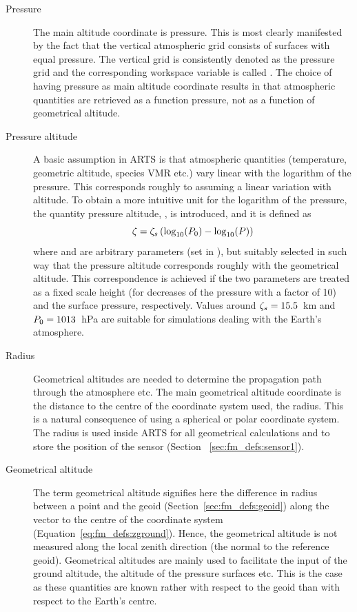 \begin{description}
  
\item[Pressure] The main altitude coordinate is
  pressure. This is most clearly manifested by the fact that the
  vertical atmospheric grid consists of surfaces with equal pressure.
  The vertical grid is consistently denoted as the pressure grid and
  the corresponding workspace variable is called . The
  choice of having pressure as main altitude coordinate results in
  that atmospheric quantities are retrieved as a function pressure,
  not as a function of geometrical altitude.
  
\item[Pressure altitude] A basic assumption
  in ARTS is that atmospheric quantities (temperature, geometric
  altitude, species VMR etc.) vary linear with the logarithm of the
  pressure. This corresponds roughly to assuming a linear variation
  with altitude. To obtain a more intuitive unit for the logarithm of
  the pressure, the quantity pressure altitude, \PrsAlt, is
  introduced, and it is defined as
  \begin{equation}
   \zeta = \zeta_{s}\left( \log_{10}(P_{0}) - \log_{10}(P) \right)
   \label{eq:fm_defs:prsalt}
  \end{equation}
  where  and  are arbitrary parameters (set in
  ), but suitably selected in such way that the pressure
  altitude corresponds roughly with the geometrical altitude.  This
  correspondence is achieved if the two parameters are treated as a
  fixed scale height (for decreases of the pressure with a factor of
  10) and the surface pressure, respectively. Values around
  $\zeta_{s}=15.5$~km and $P_{0}=1013$~hPa are suitable for
  simulations dealing with the Earth's atmosphere.
  
\item[Radius] Geometrical altitudes are
  needed to determine the propagation path through the atmosphere etc.
  The main geometrical altitude coordinate is the distance to the
  centre of the coordinate system used, the radius. This is a natural
  consequence of using a spherical or polar coordinate system. The
  radius is used inside ARTS for all geometrical calculations and to
  store the position of the sensor (Section~
  \ref{sec:fm_defs:sensor1}).
  
\item[Geometrical altitude] The term
  geometrical altitude signifies here the difference in radius between
  a point and the geoid (Section~\ref{sec:fm_defs:geoid}) along the
  vector to the centre of the coordinate system
  (Equation~\ref{eq:fm_defs:zground}). Hence, the geometrical altitude
  is not measured along the local zenith direction (the normal to the
  reference geoid). Geometrical altitudes are mainly used to
  facilitate the input of the ground altitude, the altitude of the
  pressure surfaces etc. This is the case as these quantities are known
  rather with respect to the geoid than with respect to the Earth's
  centre.

\end{description}


